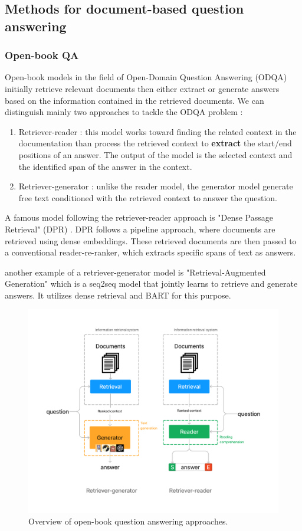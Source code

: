 \documentclass[a4paper,12pt]{article}
\begin{document}
\subsection{Methods for document-based question answering}
\subsubsection{Open-book QA}
Open-book models in the field of Open-Domain Question Answering (ODQA) initially retrieve relevant documents then either extract or generate answers based on the information contained in the retrieved documents. We can distinguish mainly two approaches to tackle the ODQA problem :

\begin{enumerate}
	\item Retriever-reader : this model works toward finding the related context in the documentation than process the retrieved context to \textbf{extract} the start/end positions of an answer. The output of the model is the selected context and the identified span of the answer in the context. 
	\item Retriever-generator : unlike the reader model, the generator model generate free text conditioned with the retrieved context to answer the question.
\end{enumerate}

A famous model following the retriever-reader approach is "Dense Passage Retrieval" (DPR) \cite{dpr}. DPR follows a pipeline approach, where documents are retrieved using dense embeddings. 
These retrieved documents are then passed to a conventional reader-re-ranker, which extracts specific spans of text as answers.

another example of a retriever-generator model is "Retrieval-Augmented Generation" \cite{rag} which is a seq2seq model that jointly learns to retrieve and generate answers. 
It utilizes dense retrieval and BART \cite{bart} for this purpose.


\begin{figure}[htbp]
	\centering
	\includegraphics[width=0.8\linewidth]{figures/openbook.png}
	\caption{Overview of open-book question answering approaches.}
	\label{fig:openbook}
\end{figure}
\end{document}
